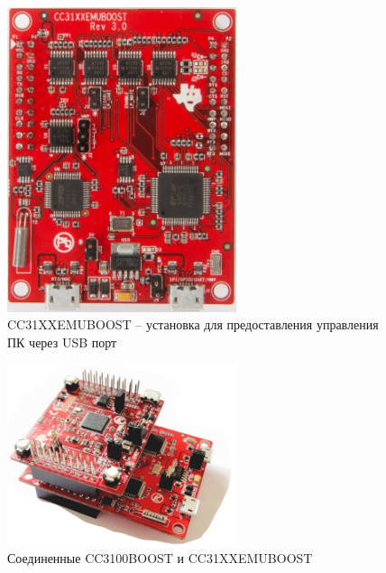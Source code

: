 \begin{figure}[!ht]
    \centering
    \includegraphics[width=0.6\textwidth]{figures/CC31XXEMUBOOST}
    \caption{CC31XXEMUBOOST -- установка для предоставления управления
    ПК через USB порт}
    \label{apx:cc31xxemuboost}
\end{figure}

\begin{figure}[!ht]
    \centering
    \includegraphics[width=0.6\textwidth]{figures/cc3100boost+emuboost}
    \caption{Соединенные CC3100BOOST и CC31XXEMUBOOST}
    \label{apx:cc31xxemuboost}
\end{figure}

